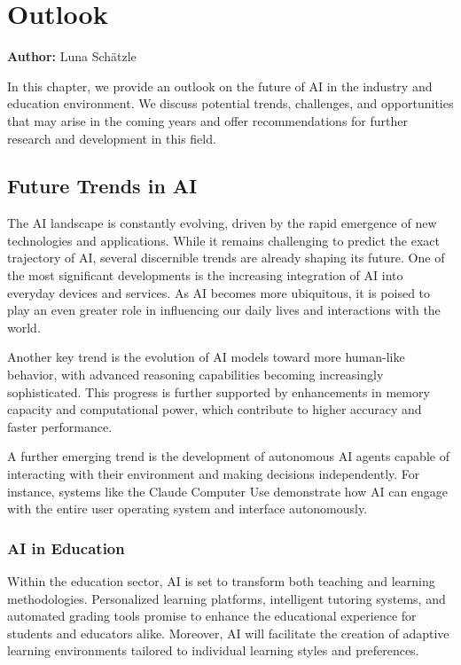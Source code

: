 \chapter{Outlook}
\label{chap:Outlook}
\textbf{Author:} Luna Schätzle 

In this chapter, we provide an outlook on the future of AI in the industry and education environment. We discuss potential trends, challenges, and opportunities that may arise in the coming years and offer recommendations for further research and development in this field.

\section{Future Trends in AI}

The AI landscape is constantly evolving, driven by the rapid emergence of new technologies and applications. While it remains challenging to predict the exact trajectory of AI, several discernible trends are already shaping its future. One of the most significant developments is the increasing integration of AI into everyday devices and services. As AI becomes more ubiquitous, it is poised to play an even greater role in influencing our daily lives and interactions with the world.

Another key trend is the evolution of AI models toward more human-like behavior, with advanced reasoning capabilities becoming increasingly sophisticated. This progress is further supported by enhancements in memory capacity and computational power, which contribute to higher accuracy and faster performance.

A further emerging trend is the development of autonomous AI agents capable of interacting with their environment and making decisions independently. For instance, systems like the Claude Computer Use demonstrate how AI can engage with the entire user operating system and interface autonomously.\cite{Claude-Computer-use}

\subsection{AI in Education}

Within the education sector, AI is set to transform both teaching and learning methodologies. Personalized learning platforms, intelligent tutoring systems, and automated grading tools promise to enhance the educational experience for students and educators alike. Moreover, AI will facilitate the creation of adaptive learning environments tailored to individual learning styles and preferences.

